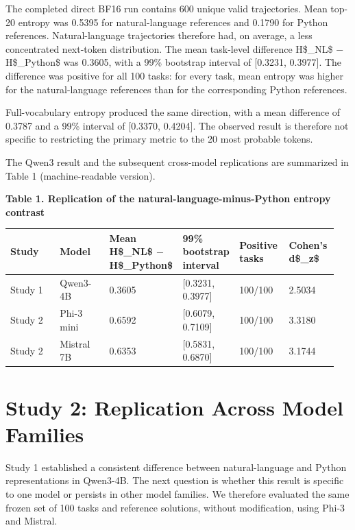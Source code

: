 \documentclass[sn-mathphys-num]{sn-jnl}
\begin{document}
The completed direct BF16 run contains 600 unique valid trajectories. Mean top-20 entropy was 0.5395 for natural-language references and 0.1790 for Python references. Natural-language trajectories therefore had, on average, a less concentrated next-token distribution. The mean task-level difference H\$\_{NL}\$ $-$ H\$\_{Python}\$ was 0.3605, with a 99\% bootstrap interval of [0.3231, 0.3977]. The difference was positive for all 100 tasks: for every task, mean entropy was higher for the natural-language references than for the corresponding Python references.

Full-vocabulary entropy produced the same direction, with a mean difference of 0.3787 and a 99\% interval of [0.3370, 0.4204]. The observed result is therefore not specific to restricting the primary metric to the 20 most probable tokens.

The Qwen3 result and the subsequent cross-model replications are summarized in Table 1 (machine-readable version).

\textbf{Table 1. Replication of the natural-language-minus-Python entropy contrast}

\begin{table}[!htbp]
\centering\scriptsize
\begin{tabular}{|p{0.158\linewidth}|p{0.158\linewidth}|p{0.158\linewidth}|p{0.158\linewidth}|p{0.158\linewidth}|p{0.158\linewidth}|}
\hline
Study & Model & Mean H\$\_{NL}\$ $-$ H\$\_{Python}\$ & 99\% bootstrap interval & Positive tasks & Cohen's d\$\_{z}\$ \\ \hline
Study 1 & Qwen3-4B & 0.3605 & [0.3231, 0.3977] & 100/100 & 2.5034 \\ \hline
Study 2 & Phi-3 mini & 0.6592 & [0.6079, 0.7109] & 100/100 & 3.3180 \\ \hline
Study 2 & Mistral 7B & 0.6353 & [0.5831, 0.6870] & 100/100 & 3.1744 \\ \hline
\end{tabular}
\end{table}

\section{Study 2: Replication Across Model Families}

Study 1 established a consistent difference between natural-language and Python representations in Qwen3-4B. The next question is whether this result is specific to one model or persists in other model families. We therefore evaluated the same frozen set of 100 tasks and reference solutions, without modification, using Phi-3 and Mistral.
\end{document}
